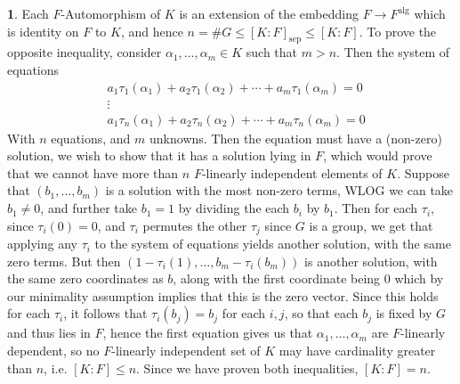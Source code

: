 \documentclass[11pt]{article}
\theoremstyle{definition}
\newtheorem{pb}{}
\newcommand{\falg}{F^{\text{alg}}}
\begin{document}
    \begin{pb}
        Each \(F\)-Automorphism of \(K\) is an extension of the embedding \(F \to \falg\) which is identity on \(F\) to \(K\), and hence
        \(n = \# G \leq [K:F]_\text{sep} \leq [K:F]\). To prove the opposite inequality, consider \(\alpha_1, \hdots, \alpha_m \in K\) such that \(m > n\).
        Then the system of equations
        \begin{align*}
            &a_1\tau_1(\alpha_1) + a_2 \tau_1(\alpha_2) + \cdots + a_m \tau_1(\alpha_m) = 0 \\
            &\vdots \\
            &a_1\tau_n(\alpha_1) + a_2 \tau_n(\alpha_2) + \cdots + a_m \tau_n(\alpha_m) = 0
        \end{align*}
        With \(n\) equations, and \(m\) unknowns. Then the equation must have a (non-zero) solution, we wish to show that it has a solution lying in \(F\),
        which would prove that we cannot have more than \(n\) \(F\)-linearly independent elements of \(K\). Suppose that \((b_1,\hdots,b_m)\)
        is a solution with the most non-zero terms, WLOG we can take \(b_1 \neq 0\), and further take \(b_1 = 1\) by dividing the each \(b_i\) by \(b_1\).
        Then for each \(\tau_i\), since \(\tau_i(0) = 0\), and \(\tau_i\) permutes the other \(\tau_j\) since \(G\) is a group, we get that
        applying any \(\tau_i\) to the system of equations yields another solution, with the same zero terms. But then 
        \((1 - \tau_i(1),\hdots,b_m - \tau_i(b_m))\) is another solution, with the same zero coordinates as \(b\), along with the first coordinate being 0
        which by our minimality assumption implies that this is the zero vector. Since this holds for each \(\tau_i\), it follows that \(\tau_i(b_j) = b_j\) for each
        \(i,j\), so that each \(b_j\) is fixed by \(G\) and thus lies in \(F\), hence the first equation gives us that \(\alpha_1,\hdots,\alpha_m\) are \(F\)-linearly dependent,
        so no \(F\)-linearly independent set of \(K\) may have cardinality greater than \(n\), i.e. \([K:F] \leq n\). Since we have proven both inequalities, \([K:F] = n\).
    \end{pb}
\end{document}
